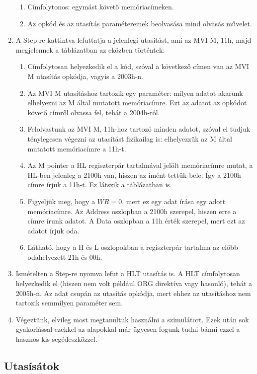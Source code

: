 \documentclass{article}
\begin{document}
\begin{enumerate}
\begin{enumerate}
		\item \colorbox{orange!30}{Címfolytonos: egymást követő memóriacímeken.}
		\item \colorbox{orange!30}{Az opkód és az utasítás paramétereinek beolvasása mind olvasás művelet.}
	\end{enumerate}
	\item A Step-re kattintva lefuttatja a jelenlegi utasítást, ami az MVI M, 11h, majd megjelennek a táblázatban az eközben történtek:
	\begin{enumerate}
		\item Címfolytosan helyezkedik el a kód, szóval a következő címen van az MVI M utasítás opkódja, vagyis a 2003h-n.
		\item Az MVI M utasításhoz tartozik egy paraméter: milyen adatot akarunk elhelyezni az M által mutatott memóriacímre. Ezt az adatot az opkódot követő címről olvassa fel, tehát a 2004h-ról.
		\item Felolvastunk az MVI M, 11h-hoz tartozó minden adatot, szóval el tudjuk ténylegesen végezni az utasítást fizikailag is: elhelyezzük az M által mutatott memóriacímre a 11h-t.
		\item Az M pointer a HL regiszterpár tartalmával jelölt memóriacímre mutat, a HL-ben jelenleg a 2100h van, hiszen az imént tettük bele. Így a 2100h címre írjuk a 11h-t. Ez látszik a táblázatban is. 
		\item Figyeljük meg, hogy a $\overline{WR} = 0$, mert ez egy adat írása egy adott memóriacímre. Az Address oszlopban a 2100h szerepel, hiszen erre a címre írunk adatot. A Data oszlopban a 11h érték szerepel, mert ezt az adatot írjuk oda.
		\item \colorbox{orange!30}{Látható, hogy a H és L oszlopokban a  regiszterpár tartalma az előbb odahelyezett 21h és 00h.}
	\end{enumerate}
	\item Ismételten a Step-re nyomva lefut a HLT utasítás is. A HLT címfolytosan helyezkedik el (hiszen nem volt például ORG direktíva vagy hasonló), tehát a 2005h-n. Az adat csupán az utasítás opkódja, mert ehhez az utasításhoz nem tartozik semmilyen paraméter sem.
	\item Végeztünk, elvileg most megtanultuk használni a szimulátort. Ezek után sok gyakorlással ezekkel az alapokkal már ügyesen fogunk tudni bánni ezzel a hasznos kis segédeszközzel.
\end{enumerate}

\subsection{Utasísátok}
\end{document}
